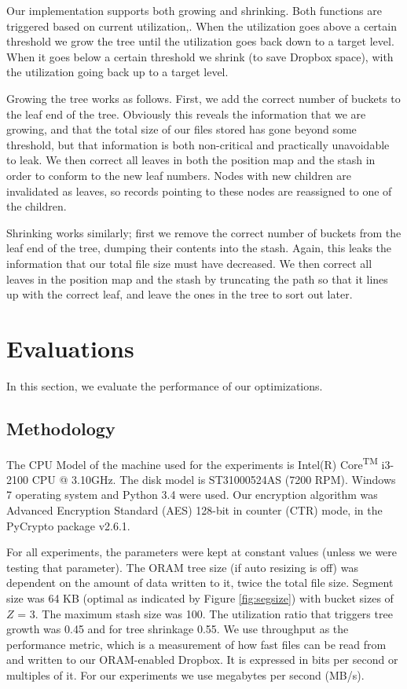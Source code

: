 \documentclass[conference]{IEEEtran}
\begin{document}
Our implementation supports both growing and shrinking. Both functions are triggered based on current utilization,. When the utilization goes above a certain threshold we grow the tree until the utilization goes back down to a target level. When it goes below a certain threshold we shrink (to save Dropbox space), with the utilization going back up to a target level.

Growing the tree works as follows. First, we add the correct number of buckets to the leaf end of the tree. Obviously this reveals the information that we are growing, and that the total size of our files stored has gone beyond some threshold, but that information is both non-critical and practically unavoidable to leak. We then correct all leaves in both the position map and the stash in order to conform to the new leaf numbers. Nodes with new children are invalidated as leaves, so records pointing to these nodes are reassigned to one of the children.

Shrinking works similarly; first we remove the correct number of buckets from the leaf end of the tree, dumping their contents into the stash. Again, this leaks the information that our total file size must have decreased. We then correct all leaves in the position map and the stash by truncating the path so that it lines up with the correct leaf, and leave the ones in the tree to sort out later.

\section{Evaluations}

\label{sec:Eval}
In this section, we evaluate the performance of our optimizations. 
\subsection{Methodology}

The CPU Model of the machine used for the experiments is Intel(R) Core\textsuperscript{TM} i3-2100 CPU @ 3.10GHz. The disk model is ST31000524AS (7200 RPM). Windows 7 operating system and Python 3.4 were used. Our encryption algorithm was Advanced Encryption Standard (AES) 128-bit in counter (CTR) mode, in the PyCrypto package v2.6.1.

For all experiments, the parameters were kept at constant values (unless we were testing that parameter). The ORAM tree size (if auto resizing is off) was dependent on the amount of data written to it, twice the total file size. Segment size was 64 KB (optimal as indicated by Figure \ref{fig:segsize}) with bucket sizes of $Z$ = 3.  The maximum stash size was 100. The utilization ratio that triggers tree growth was 0.45 and for tree shrinkage 0.55. We use throughput as the performance metric, which is a measurement of how fast files can be read from and written to our ORAM-enabled Dropbox. It is expressed in bits per second or multiples of it. For our experiments we use megabytes per second (MB/s).
\end{document}
